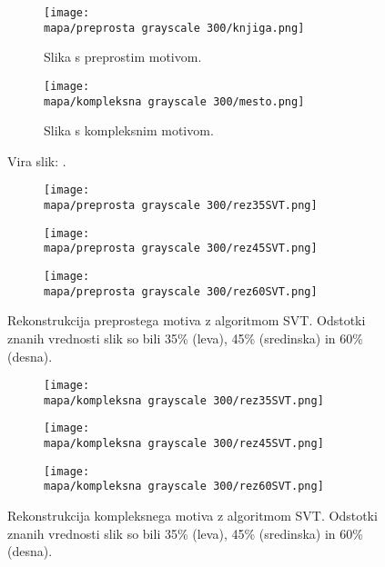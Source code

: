 \renewcommand{\mapa}{Poglavja/Slike/kompleksnost}

\begin{figure}[!ht]
    \begin{subfigure}{0.5\linewidth}
        \texttt{[image: \\mapa/preprosta grayscale 300/knjiga.png]}
        \caption{Slika s preprostim motivom.}
    \end{subfigure}
    \hfill
    \begin{subfigure}{0.5\linewidth}
        \texttt{[image: \\mapa/kompleksna grayscale 300/mesto.png]}
        \caption{Slika s kompleksnim motivom.}
    \end{subfigure}
    \caption{Vira slik: \cite{UnsplashKnjiga,UnsplashMesto}.}
\end{figure}

\begin{figure}[!ht]
    \begin{subfigure}{0.325\linewidth}
        \texttt{[image: \\mapa/preprosta grayscale 300/rez35SVT.png]}
    \end{subfigure}
    \hfill
    \begin{subfigure}{0.325\linewidth}
        \texttt{[image: \\mapa/preprosta grayscale 300/rez45SVT.png]}
    \end{subfigure}
    \hfill
    \begin{subfigure}{0.325\linewidth}
        \texttt{[image: \\mapa/preprosta grayscale 300/rez60SVT.png]}
    \end{subfigure}
    \caption{Rekonstrukcija preprostega motiva z algoritmom SVT. Odstotki znanih vrednosti slik so bili 35\% (leva), 45\% (sredinska) in 60\% (desna).
    }
\end{figure}
    
\begin{figure}[!ht]
    \begin{subfigure}{0.325\linewidth}
        \texttt{[image: \\mapa/kompleksna grayscale 300/rez35SVT.png]}
    \end{subfigure}
    \hfill
    \begin{subfigure}{0.325\linewidth}
        \texttt{[image: \\mapa/kompleksna grayscale 300/rez45SVT.png]}
    \end{subfigure}
    \hfill
    \begin{subfigure}{0.325\linewidth}
        \texttt{[image: \\mapa/kompleksna grayscale 300/rez60SVT.png]}
    \end{subfigure}
    \caption{Rekonstrukcija kompleksnega motiva z algoritmom SVT. Odstotki znanih vrednosti slik so bili 35\% (leva), 45\% (sredinska) in 60\% (desna).}
\end{figure}

